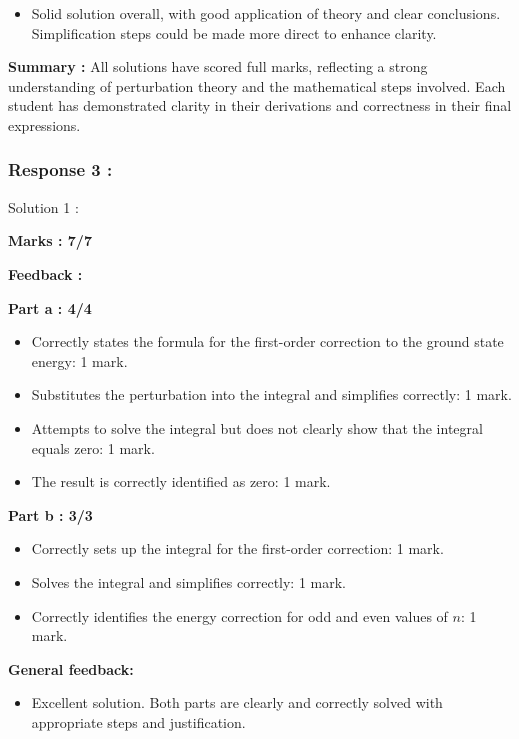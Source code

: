 \documentclass[a4paper,11pt]{article}
\begin{document}
\begin{itemize}
    \item Solid solution overall, with good application of theory and clear conclusions. Simplification steps could be made more direct to enhance clarity.
\end{itemize}

\textbf{Summary :}
All solutions have scored full marks, reflecting a strong understanding of perturbation theory and the mathematical steps involved. Each student has demonstrated clarity in their derivations and correctness in their final expressions.



\subsubsection*{Response 3 :}

Solution 1 :

\textbf{Marks : 7/7}

\textbf{Feedback :}

\textbf{Part a : 4/4}

\begin{itemize}
    \item Correctly states the formula for the first-order correction to the ground state energy: 1 mark.
    \item Substitutes the perturbation into the integral and simplifies correctly: 1 mark.
    \item Attempts to solve the integral but does not clearly show that the integral equals zero: 1 mark.
    \item The result is correctly identified as zero: 1 mark.
\end{itemize}


\textbf{Part b : 3/3}

\begin{itemize}
    \item Correctly sets up the integral for the first-order correction: 1 mark.
    \item Solves the integral and simplifies correctly: 1 mark.
    \item Correctly identifies the energy correction for odd and even values of $n$: 1 mark.
\end{itemize}

\textbf{General feedback:}

\begin{itemize}
    \item Excellent solution. Both parts are clearly and correctly solved with appropriate steps and justification.
\end{itemize}
\end{document}
